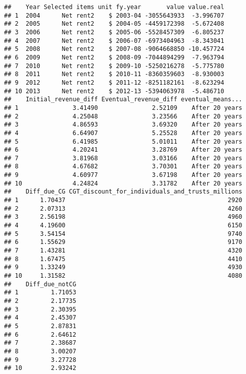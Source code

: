 \documentclass{grattan}\usepackage[]{graphicx}\usepackage[]{color}
\makeatletter
\newenvironment{kframe}{%
 \def\at@end@of@kframe{}%
 \ifinner\ifhmode%
  \def\at@end@of@kframe{\end{minipage}}%
  \begin{minipage}{\columnwidth}%
 \fi\fi%
 \def\FrameCommand##1{\hskip\@totalleftmargin \hskip-\fboxsep
 \colorbox{shadecolor}{##1}\hskip-\fboxsep
     \hskip-\linewidth \hskip-\@totalleftmargin \hskip\columnwidth}%
 \MakeFramed {\advance\hsize-\width
   \@totalleftmargin\z@ \linewidth\hsize
   \@setminipage}}%
 {\par\unskip\endMakeFramed%
 \at@end@of@kframe}
\newenvironment{knitrout}{}{} %
\makeatother
\begin{document}
\begin{knitrout}
\color{fgcolor}\begin{kframe}
\begin{verbatim}
##    Year Selected items unit fy.year       value value.real
## 1  2004      Net rent2    $ 2003-04 -3055643933  -3.996707
## 2  2005      Net rent2    $ 2004-05 -4459172398  -5.672408
## 3  2006      Net rent2    $ 2005-06 -5528457309  -6.805237
## 4  2007      Net rent2    $ 2006-07 -6973404963  -8.343041
## 5  2008      Net rent2    $ 2007-08 -9064668850 -10.457724
## 6  2009      Net rent2    $ 2008-09 -7044894299  -7.963794
## 7  2010      Net rent2    $ 2009-10 -5250216278  -5.775780
## 8  2011      Net rent2    $ 2010-11 -8360359603  -8.930003
## 9  2012      Net rent2    $ 2011-12 -8251182161  -8.623294
## 10 2013      Net rent2    $ 2012-13 -5394063978  -5.486710
##    Initial_revenue_diff Eventual_revenue_diff eventual_means...
## 1               3.41490               2.52109    After 20 years
## 2               4.25048               3.23566    After 20 years
## 3               4.86593               3.69320    After 20 years
## 4               6.64907               5.25528    After 20 years
## 5               6.41985               5.01011    After 20 years
## 6               4.20241               3.28769    After 20 years
## 7               3.81968               3.03166    After 20 years
## 8               4.67682               3.70301    After 20 years
## 9               4.60977               3.67198    After 20 years
## 10              4.24824               3.31782    After 20 years
##    Diff_due_CG CGT_discount_for_individuals_and_trusts_millions
## 1      1.70437                                             2920
## 2      2.07313                                             4260
## 3      2.56198                                             4960
## 4      4.19600                                             6150
## 5      3.54154                                             9740
## 6      1.55629                                             9170
## 7      1.43281                                             4320
## 8      1.67475                                             4410
## 9      1.33249                                             4930
## 10     1.31582                                             4080
##    Diff_due_notCG
## 1         1.71053
## 2         2.17735
## 3         2.30395
## 4         2.45307
## 5         2.87831
## 6         2.64612
## 7         2.38687
## 8         3.00207
## 9         3.27728
## 10        2.93242
\end{verbatim}
\end{kframe}
\end{knitrout}
\end{document}
